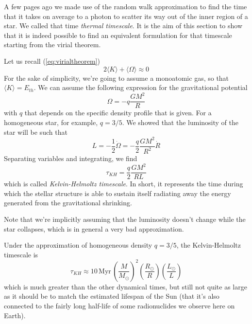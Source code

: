 A few pages ago we made use of the random walk approximation to find the time that it takes on average to a photon to scatter its way out of the inner region of a star. We called that time \emph{thermal timescale}. It is the aim of this section to show that it is indeed possible to find an equivalent formulation for that timescale starting from the virial theorem.
\par Let us recall (\ref{eq:virialtheorem})
\begin{equation*}
	2\langle K \rangle + \langle \Omega \rangle \approx 0
\end{equation*}
For the sake of simplicity, we're going to assume a monoatomic gas, so that $\langle K \rangle = E_{th}$. We can assume the following expression for the gravitational potential
\begin{equation*}
	\Omega = -q\frac{GM^{2}}{R}
\end{equation*}
with $q$ that depends on the specific density profile that is given. For a homogeneous star, for example, $q=3/5$. We showed that the luminosity of the star will be such that
\begin{equation*}
	L = -\frac{1}{2}\dot{\Omega} = -\frac{q}{2}\frac{GM^{2}}{R^{2}}\dot{R}
\end{equation*}
Separating variables and integrating, we find
\begin{equation}
	\tau_{KH} = \frac{q}{2}\frac{GM^{2}}{RL}
	\label{eq:kh_timescale}
\end{equation}
which is called \emph{Kelvin-Helmoltz timescale}. In short, it represents the time during which the stellar structure is able to sustain itself radiating away the energy generated from the gravitational shrinking.
\par Note that we're implicitly assuming that the luminosity doesn't change while the star collapses, which is in general a very bad approximation.
\par Under the approximation of homogeneous density $q = 3/5$, the Kelvin-Helmoltz timescale is
\begin{equation*}
	\tau_{KH} \approx 10\,\text{Myr}\,\left(\frac{M}{M_{\odot}}\right)^{2}\left(\frac{R_{\odot}}{R}\right)\left(\frac{L_{\odot}}{L}\right)
\end{equation*}
which is much greater than the other dynamical times, but still not quite as large as it should be to match the estimated lifespan of the Sun (that it's also connected to the fairly long half-life of some radionuclides we observe here on Earth).

